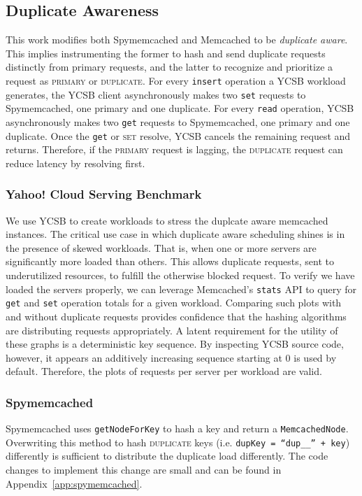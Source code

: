 \documentclass[11pt,titlepage]{article}
\begin{document}
\subsection{Duplicate Awareness}

This work modifies both Spymemcached and Memcached to be \textit{duplicate
aware}. This implies instrumenting the former to hash and send duplicate
requests distinctly from primary requests, and the latter to recognize and
prioritize a request as \textsc{primary} or \textsc{duplicate}. For every
\texttt{insert} operation a YCSB workload generates, the YCSB client
asynchronously makes two \texttt{set} requests to Spymemcached, one primary and
one duplicate. For every \texttt{read} operation, YCSB asynchronously makes two
\texttt{get} requests to Spymemcached, one primary and one duplicate. Once the
\texttt{get} or \textsc{set} resolve, YCSB cancels the remaining request and
returns. Therefore, if the \textsc{primary} request is lagging, the
\textsc{duplicate} request can reduce latency by resolving first.

\subsubsection{Yahoo! Cloud Serving Benchmark}

We use YCSB to create workloads to stress the duplcate aware memcached
instances. The critical use case in which duplicate aware scheduling shines is
in the presence of skewed workloads. That is, when one or more servers are
significantly more loaded than others. This allows duplicate requests, sent to
underutilized resources, to fulfill the otherwise blocked request. To verify we
have loaded the servers properly, we can leverage Memcached's \texttt{stats} API to
query for \texttt{get} and \texttt{set} operation totals for a given workload.
Comparing such plots with and without duplicate requests provides confidence
that the hashing algorithms are distributing requests appropriately. A latent
requirement for the utility of these graphs is a deterministic key sequence. By
inspecting YCSB source code, however, it appears an additively increasing
sequence starting at 0 is used by default. Therefore, the plots of requests per
server per workload are valid.

\subsubsection{Spymemcached}

Spymemcached uses \texttt{getNodeForKey} to hash a key and return a
\texttt{MemcachedNode}. Overwriting this method to hash \textsc{duplicate} keys
(i.e. \texttt{dupKey = ``dup\_\_'' + key}) differently is sufficient to
distribute the duplicate load differently.  The code changes to implement this
change are small and can be found in Appendix~\ref{app:spymemcached}.
\end{document}
